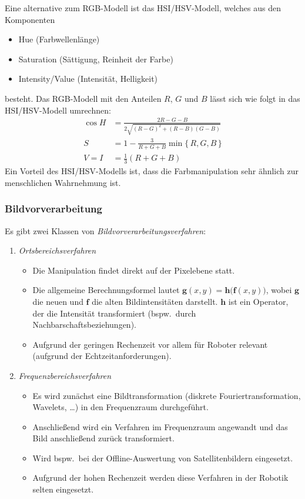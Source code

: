 \documentclass[a4paper, 11pt, accentcolor = tud3b]{tudreport}
\renewcommand{\vec}[1]{\boldsymbol{\mathbf{#1}}}
\newcommand{\bspw}{bspw.~}
\begin{document}
					Eine alternative zum RGB-Modell ist das HSI/HSV-Modell, welches aus den Komponenten
					\begin{itemize}
						\item Hue (Farbwellenlänge)
						\item Saturation (Sättigung, Reinheit der Farbe)
						\item Intensity/Value (Intensität, Helligkeit)
					\end{itemize}
					besteht. Das RGB-Modell mit den Anteilen \(R\), \(G\) und \(B\) lässt sich wie folgt in das HSI/HSV-Modell umrechnen:
					\begin{align*}
						\cos H & = \frac{2R - G - B}{2\sqrt{(R - G)^2 + (R - B)(G - B)}} \\
						S      & = 1 - \frac{3}{R + G + B} \min \{\, R, G, B \,\}        \\
						V = I  & = \frac{1}{3} (R + G + B)
					\end{align*}
					Ein Vorteil des HSI/HSV-Modells ist, dass die Farbmanipulation sehr ähnlich zur menschlichen Wahrnehmung ist.

				\subsubsection{Bildvorverarbeitung}
					Es gibt zwei Klassen von \emph{Bildvorverarbeitungsverfahren}:
					\begin{enumerate}
						\item \emph{Ortsbereichsverfahren}
							\begin{itemize}
								\item Die Manipulation findet direkt auf der Pixelebene statt.
								\item Die allgemeine Berechnungsformel lautet \( \vec{g}(x, y) = \vec{h}\big(\vec{f}(x, y)\big) \), wobei \(\vec{g}\) die neuen und \(\vec{f}\) die alten Bildintensitäten darstellt. \(\vec{h}\) ist ein Operator, der die Intensität transformiert (\bspw durch Nachbarschaftsbeziehungen).
								\item Aufgrund der geringen Rechenzeit vor allem für Roboter relevant (aufgrund der Echtzeitanforderungen).
							\end{itemize}
						\item \emph{Frequenzbereichsverfahren}
							\begin{itemize}
								\item Es wird zunächst eine Bildtransformation (diskrete Fouriertransformation, Wavelets, \dots) in den Frequenzraum durchgeführt.
								\item Anschließend wird ein Verfahren im Frequenzraum angewandt und das Bild anschließend zurück transformiert.
								\item Wird \bspw bei der Offline-Auswertung von Satellitenbildern eingesetzt.
								\item Aufgrund der hohen Rechenzeit werden diese Verfahren in der Robotik selten eingesetzt.
							\end{itemize}
					\end{enumerate}
\end{document}
